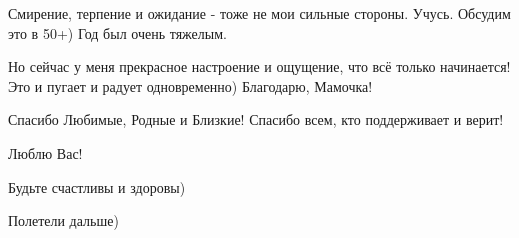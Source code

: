 Смирение, терпение и ожидание - тоже не мои сильные стороны. 
Учусь. Обсудим это в 50+) 
Год был очень тяжелым.

Но сейчас  у меня прекрасное настроение и ощущение, что всё только начинается! Это и пугает и радует одновременно)
Благодарю, Мамочка! 

Спасибо Любимые, Родные и Близкие! 
Спасибо всем, кто поддерживает и верит! 

Люблю Вас!

Будьте счастливы и здоровы) 

Полетели дальше)
\restorecr
